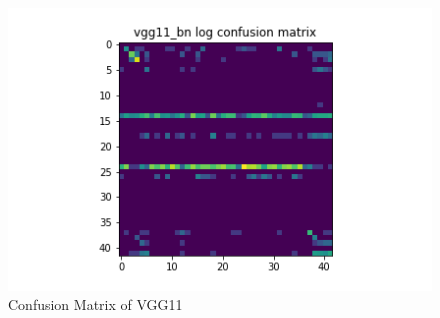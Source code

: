 \begin{figure}[t]
\begin{minipage}[b]{.5\linewidth}
  \end{minipage}
  \hfill
  \begin{minipage}[b]{.5\linewidth}
    \centering
    \includegraphics[width=1.2\textwidth]{figs/conf_matrix/vgg11_bn_log_conf.png}
  \end{minipage}
  \caption{Confusion Matrix of VGG11}
  \label{fig:vgg11_conf}
\end{figure}

